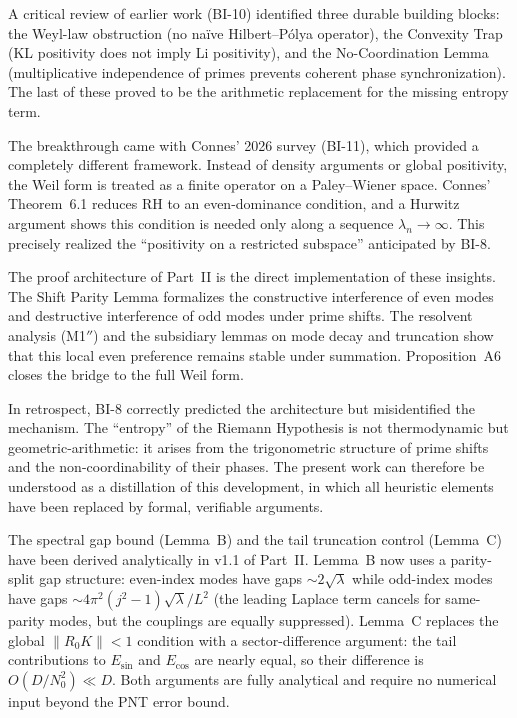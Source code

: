 \documentclass[12pt,a4paper]{article}
\theoremstyle{definition}
\theoremstyle{remark}
\begin{document}
A critical review of earlier work (BI-10) identified three durable building blocks: the Weyl-law obstruction (no na\"ive Hilbert--P\'olya operator), the Convexity Trap (KL positivity does not imply Li positivity), and the No-Coordination Lemma (multiplicative independence of primes prevents coherent phase synchronization). The last of these proved to be the arithmetic replacement for the missing entropy term.

The breakthrough came with Connes' 2026 survey \cite{Connes2026} (BI-11), which provided a completely different framework. Instead of density arguments or global positivity, the Weil form is treated as a finite operator on a Paley--Wiener space. Connes' Theorem~6.1 reduces RH to an even-dominance condition, and a Hurwitz argument shows this condition is needed only along a sequence $\lambda_n \to \infty$. This precisely realized the ``positivity on a restricted subspace'' anticipated by BI-8.

The proof architecture of Part~II is the direct implementation of these insights. The Shift Parity Lemma formalizes the constructive interference of even modes and destructive interference of odd modes under prime shifts. The resolvent analysis (M1$''$) and the subsidiary lemmas on mode decay and truncation show that this local even preference remains stable under summation. Proposition~A6 closes the bridge to the full Weil form.

In retrospect, BI-8 correctly predicted the architecture but misidentified the mechanism. The ``entropy'' of the Riemann Hypothesis is not thermodynamic but geometric-arithmetic: it arises from the trigonometric structure of prime shifts and the non-coordinability of their phases. The present work can therefore be understood as a distillation of this development, in which all heuristic elements have been replaced by formal, verifiable arguments.

The spectral gap bound (Lemma~B) and the tail truncation control (Lemma~C) have been derived analytically in v1.1 of Part~II. Lemma~B now uses a parity-split gap structure: even-index modes have gaps $\sim 2\sqrt{\lambda}$ while odd-index modes have gaps $\sim 4\pi^2(j^2-1)\sqrt{\lambda}/L^2$ (the leading Laplace term cancels for same-parity modes, but the couplings are equally suppressed). Lemma~C replaces the global $\|R_0 K\| < 1$ condition with a sector-difference argument: the tail contributions to $E_{\sin}$ and $E_{\cos}$ are nearly equal, so their difference is $O(D/N_0^2) \ll D$. Both arguments are fully analytical and require no numerical input beyond the PNT error bound.
\end{document}
